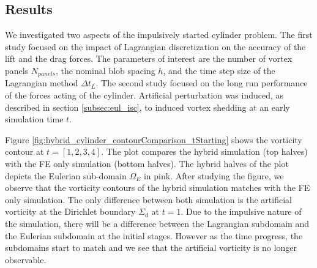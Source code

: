 

\subsection{Results}

We investigated two aspects of the impulsively started cylinder problem. The first study focused on the impact of Lagrangian discretization on the accuracy of the lift and the drag forces. The parameters of interest are the number of vortex panels $N_{panels}$, the nominal blob spacing $h$, and the time step size of the Lagrangian method $\Delta t_L$. The second study focused on the long run performance of the forces acting of the cylinder. Artificial perturbation was induced, as described in section \ref{subsec:eul_isc}, to induced vortex shedding at an early simulation time $t$.

Figure \ref{fig:hybrid_cylinder_contourComparison_tStarting} shows the vorticity contour at $t = [1,2,3,4]$. The plot compares the hybrid simulation (top halves) with the FE only simulation (bottom halves). The hybrid halves of the plot depicts the Eulerian sub-domain $\Omega_E$ in pink. After studying the figure, we observe that the vorticity contours of the hybrid simulation matches with the FE only simulation. The only difference between both simulation is the artificial vorticity at the Dirichlet boundary $\Sigma_d$ at $t=1$. Due to the impulsive nature of the simulation, there will be a difference between the Lagrangian subdomain and the Eulerian subdomain at the initial stages. However as the time progress, the subdomains start to match and we see that the artificial vorticity is no longer observable.




